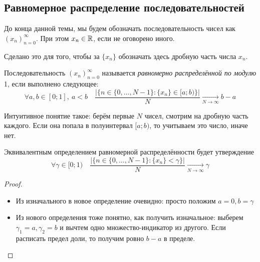 \subsection{Равномерное распределение последовательностей}

\begin{note}
	До конца данной темы, мы будем обозначать последовательность чисел как $(x_n)_{n = 0}^\infty$. При этом $x_n \in \mathbb{R}$, если не оговорено иного.
	
	Сделано это для того, чтобы за $\{x_n\}$ обозначать здесь дробную часть числа $x_n$.
\end{note}

\begin{definition}
	Последовательность $(x_n)_{n = 0}^\infty$ называется \textit{равномерно распределённой по модулю} 1, если выполнено следующее:
	\[
		\forall a, b \in [0; 1],\ a < b \quad \frac{|\{n \in \{0, \ldots, N - 1\} \colon \{x_n\} \in [a; b)\}|}{N} \xrightarrow[N \to \infty]{} b - a
	\]
\end{definition}

\begin{note}
	Интуитивное понятие такое: берём первые $N$ чисел, смотрим на дробную часть каждого. Если она попала в полуинтервал $[a; b)$, то учитываем это число, иначе нет.
\end{note}

\begin{proposition}
	Эквивалентным определением равномерной распределённости будет утверждение
	\[
		\forall \gamma \in [0; 1) \quad \frac{|\{n \in \{0, \ldots, N - 1\}\colon \{x_n\} < \gamma\}|}{N} \xrightarrow[N \to \infty]{} \gamma
	\]
\end{proposition}

\begin{proof}~
	\begin{itemize}
		\item Из изначального в новое определение очевидно: просто положим $a = 0, b = \gamma$
		
		\item Из нового определения тоже понятно, как получить изначальное: выберем $\gamma_1 = a, \gamma_2 = b$ и вычтем одно множество-индикатор из другого. Если расписать предел доли, то получим ровно $b - a$ в пределе.
	\end{itemize}
\end{proof}

